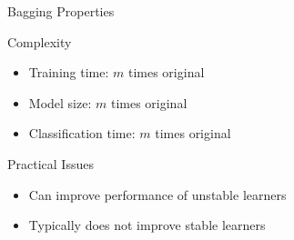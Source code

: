 \documentclass[12pt]{beamer}
\begin{document}
\begin{frame}{Bagging Properties}
	\begin{block}{Complexity}
		\begin{itemize}
			\pause
			\item Training time: \pause $m$ times original
			\pause
			\item Model size: \pause $m$ times original
			\pause
			\item Classification time: \pause $m$ times original
		\end{itemize}
	\end{block}
	\pause
	\begin{block}{Practical Issues}
		\begin{itemize}
			\item Can improve performance of unstable learners
			\item Typically does not improve stable learners
		\end{itemize}
	\end{block}
\end{frame}
\end{document}
